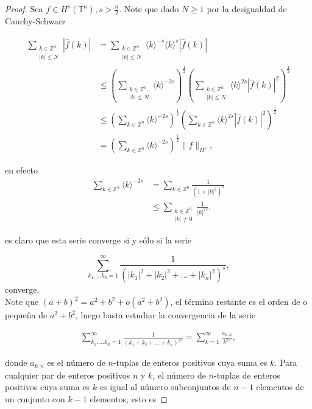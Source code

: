 \documentclass[12pt]{article}
\newcommand\Z{\ensuremath{\mathbb{Z}}}
\newcommand\T{\mathbb{T}}
\newcommand\jk{\langle k\rangle}
\begin{document}
\begin{proof}

Sea $f \in H^s(\T^n), s>\frac{n}{2}$. Note que dado $N\geq 1$ por la desigualdad de Cauchy-Schwarz

$$
\begin{aligned}
\sum_{\substack{k\in\Z^n\\
|k|\leq N}}|\widehat{f}(k)| & =\sum_{\substack{k\in\Z^n\\
|k|\leq N}}\langle k\rangle^{-s}\langle k\rangle^s|\widehat{f}(k)| \\
& \leq\left(\sum_{\substack{k\in\Z^n\\
|k|\leq N}}\langle k\rangle^{-2 s}\right)^{\frac{1}{2}}\left(\sum_{\substack{k\in\Z^n\\
|k|\leq N}}\langle k\rangle^{2 s}|\widehat{f}(k)|^2\right)^{\frac{1}{2}} \\
& \leq\left(\sum_{k\in \Z^n}\langle k\rangle^{-2 s}\right)^{\frac{1}{2}}\left(\sum_{k\in \Z^n}\langle k\rangle^{2 s}|\widehat{f}(k)|^2\right)^{\frac{1}{2}} \\
& =\left(\sum_{k\in \Z^n}\langle k\rangle^{-2 s}\right)^{\frac{1}{2}}\|f\|_{H^s},
\end{aligned}
$$

en efecto
\begin{align*}
    \sum_{k\in \Z^n}\jk^{-2s}&=\sum_{k\in \Z^n}\frac{1}{(1+|k|^2)^s}\\
    &\leq \sum_{\substack{k\in \Z^n\\
    |k|\neq 0}}\frac{1}{|k|^{2s}}
    ,\end{align*}

es claro que esta serie converge si y sólo si la serie

$$\sum_{k_1,\ldots k_n=1}^{\infty}\frac{1}{(|k_1|^2+|k_2|^2+\ldots+|k_n|^2)^s},$$
converge.\\
Note que $(a+b)^2=a^2+b^2+o(a^2+b^2)$, el término restante es el orden de o pequeña de $a^2+b^2$, luego basta estudiar la convergencia de la serie

\begin{align*}
   \sum_{k_1,\ldots k_n=1}^{\infty}\frac{1}{(k_1+k_2+\ldots+k_n)^{2s}}=\sum_{k=1}^{\infty}\frac{a_{k,n}}{k^{2s}}
,\end{align*}

donde $a_{k,n}$ es el número de $n$-tuplas de enteros  positivos cuya suma es $k$. Para cualquier par de enteros positivos $n$ y $k$, el número de $n$-tuplas de enteros positivos cuya suma es $k$ es igual al número subconjuntos de $n - 1$ elementos de un conjunto con $k - 1$ elementos, esto es


\end{proof}
\end{document}
